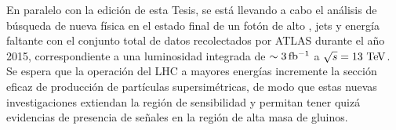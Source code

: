 En paralelo con la edición de esta Tesis, se está llevando a cabo el análisis de
búsqueda de nueva física en el estado final de un fotón de alto {\pt}, jets y
energía faltante con el conjunto total de datos recolectados por ATLAS durante
el a\~no 2015, correspondiente a una luminosidad integrada de $\sim
\unit[3]{fb^{-1}}$ a $\sqrt{s}=13 \tev$. Se espera que la operación del LHC a
mayores energías incremente la sección eficaz de producción de partículas
supersimétricas, de modo que estas nuevas investigaciones extiendan la región de
sensibilidad y permitan tener quizá evidencias de presencia de se\~nales en la
región de alta masa de gluinos.
